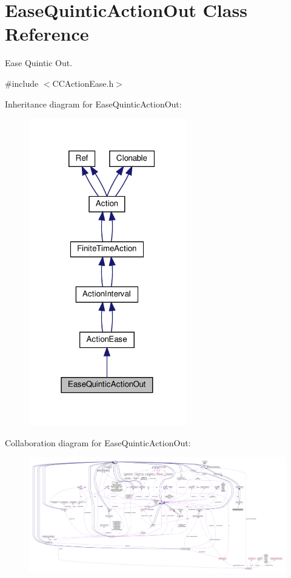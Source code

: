 \hypertarget{classEaseQuinticActionOut}{}\section{Ease\+Quintic\+Action\+Out Class Reference}
\label{classEaseQuinticActionOut}


Ease Quintic Out.  




{\ttfamily \#include $<$C\+C\+Action\+Ease.\+h$>$}



Inheritance diagram for Ease\+Quintic\+Action\+Out\+:
\nopagebreak
\begin{figure}[H]
\begin{center}
\leavevmode
\includegraphics[width=195pt]{classEaseQuinticActionOut__inherit__graph}
\end{center}
\end{figure}


Collaboration diagram for Ease\+Quintic\+Action\+Out\+:
\nopagebreak
\begin{figure}[H]
\begin{center}
\leavevmode
\includegraphics[width=350pt]{classEaseQuinticActionOut__coll__graph}
\end{center}
\end{figure}
